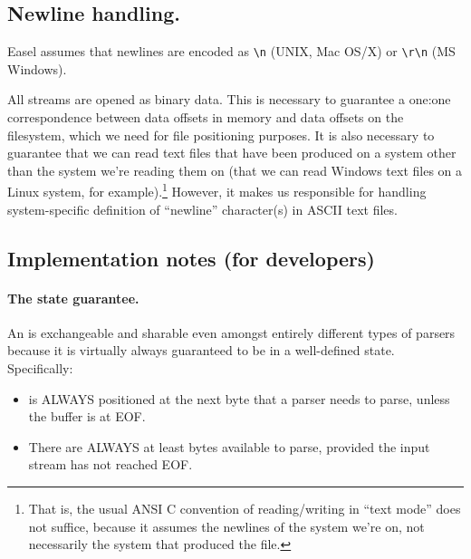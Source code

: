 \subsection{Newline handling.}

Easel assumes that newlines are encoded as \verb+\n+ (UNIX, Mac OS/X)
or \verb+\r\n+ (MS Windows).

All streams are opened as binary data. This is necessary to guarantee
a one:one correspondence between data offsets in memory and data
offsets on the filesystem, which we need for file positioning
purposes. It is also necessary to guarantee that we can read text
files that have been produced on a system other than the system we're
reading them on (that we can read Windows text files on a Linux
system, for example).\footnote{That is, the usual ANSI C convention of
  reading/writing in ``text mode'' does not suffice, because it
  assumes the newlines of the system we're on, not necessarily the
  system that produced the file.}  However, it makes us responsible
for handling system-specific definition of ``newline'' character(s) in
ASCII text files.






















 








\subsection{Implementation notes (for developers)}

\paragraph{The state guarantee.} An  is exchangeable
and sharable even amongst entirely different types of parsers because
it is virtually always guaranteed to be in a well-defined
state. Specifically:

\begin{itemize}
\item {} is ALWAYS positioned at the next byte
      that a parser needs to parse, unless the buffer is at EOF. 

\item There are ALWAYS at least  bytes available to
      parse, provided the input stream has not reached EOF.
\end{itemize}


